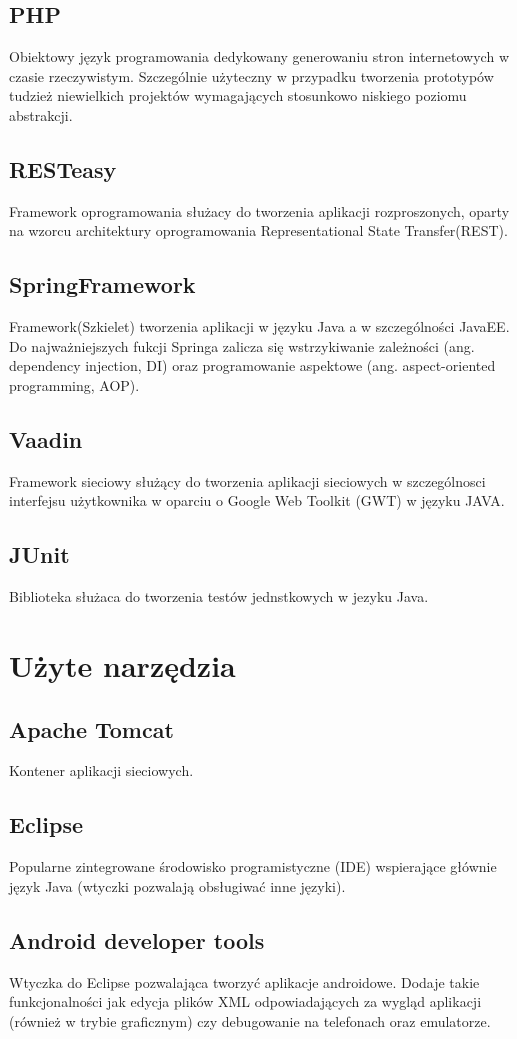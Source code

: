 \documentclass[11pt,a4paper,polish,thesis]{dcsbook}
\begin{document}
\subsection{PHP}
Obiektowy język programowania dedykowany generowaniu stron internetowych w czasie rzeczywistym. Szczególnie użyteczny w przypadku tworzenia prototypów tudzież niewielkich projektów wymagających stosunkowo niskiego poziomu abstrakcji.
\subsection{RESTeasy}
Framework oprogramowania służacy do tworzenia aplikacji rozproszonych, oparty na wzorcu architektury oprogramowania Representational State Transfer(REST).
\subsection{SpringFramework}
Framework(Szkielet) tworzenia aplikacji w języku Java a w szczególności JavaEE. Do najważniejszych fukcji Springa zalicza się wstrzykiwanie zależności (ang. dependency injection, DI) oraz programowanie aspektowe (ang. aspect-oriented programming, AOP).  
\subsection{Vaadin}
Framework sieciowy służący do tworzenia aplikacji sieciowych w szczególnosci interfejsu użytkownika w oparciu o Google Web Toolkit (GWT) w języku JAVA.
\subsection{JUnit}
Biblioteka służaca do tworzenia testów jednstkowych w jezyku Java.

\section{Użyte narzędzia}
\subsection{Apache Tomcat}
Kontener aplikacji sieciowych.
\subsection{Eclipse}
Popularne zintegrowane środowisko programistyczne (IDE) wspierające głównie język Java (wtyczki pozwalają obsługiwać inne języki). 
\subsection{Android developer tools}
Wtyczka do Eclipse pozwalająca tworzyć aplikacje androidowe. Dodaje takie funkcjonalności jak edycja plików XML odpowiadających za wygląd aplikacji (również w trybie graficznym) czy debugowanie na telefonach oraz emulatorze.
\end{document}

